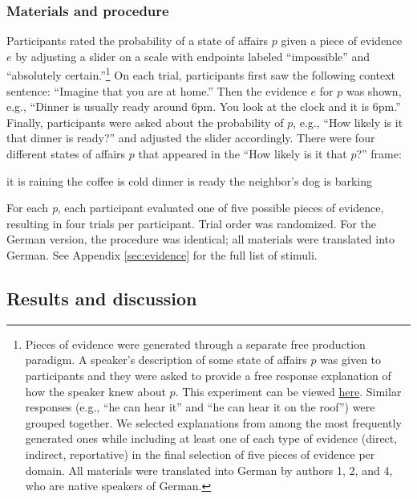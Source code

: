 \documentclass[11pt]{article}
\newcommand{\appref}[1]{Appendix \ref{#1}}
\begin{document}
\subsubsection{Materials and procedure}

Participants rated the probability of a state of affairs $p$ given a piece of evidence $e$ by adjusting a slider on a scale with endpoints labeled ``impossible'' and ``absolutely certain.''\footnote{Pieces of evidence were generated through a separate free production paradigm.  A speaker's description of some state of affairs $p$ was given to participants and they were asked to provide a free response explanation of how the speaker knew about $p$. This experiment can be viewed \href{http://stanford.edu/~jdegen/68_modals_freeproduction/modals.html}{here}. Similar responses (e.g., ``he can hear it'' and ``he can hear it on the roof'') were grouped together. We selected explanations from among the most frequently generated ones while including at least one of each type of evidence (direct, indirect, reportative) in the final selection of five pieces of evidence per domain. All materials were translated into German by authors 1, 2, and 4, who are native speakers of German.} On each trial, participants first saw the following context sentence: ``Imagine that you are at home.'' Then the evidence $e$ for $p$ was shown, e.g., ``Dinner is usually ready around 6pm. You look at the clock and it is 6pm.'' Finally, participants were asked about the probability of $p$, e.g., ``How likely is it that dinner is ready?'' and adjusted the slider accordingly. There were four different states of affairs $p$ that appeared in the ``How likely is it that $p$?'' frame:

\begin{exe}
\ex
\begin{xlist}
	\ex it is raining
	\ex the coffee is cold
	\ex dinner is ready
	\ex the neighbor's dog is barking
	\end{xlist}
\end{exe}

For each \emph{p}, each participant evaluated one of five possible pieces of evidence, resulting in four trials per participant. Trial order was randomized. 
For the German version, the procedure was identical; all materials were translated into German. See \appref{sec:evidence} for the full list of stimuli.

\subsection{Results and discussion}
\end{document}
